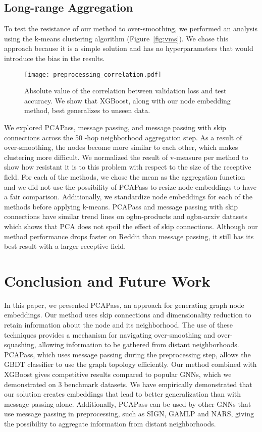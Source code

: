 \documentclass[nohyperref]{article}
\theoremstyle{plain}
\theoremstyle{definition}
\theoremstyle{remark}
\begin{document}
\subsection{Long-range Aggregation}
To test the resistance of our method to over-smoothing, we performed an analysis using the k-means clustering algorithm (Figure~\ref{fig:vms}). We chose this approach because it is a simple solution and has no hyperparameters that would introduce the bias in the results.
\begin{figure}[H]
    \vskip 0.2in
    \begin{center}
    \centerline{\texttt{[image: preprocessing\_correlation.pdf]}}
    \caption{Absolute value of the correlation between validation loss and test accuracy. We show that XGBoost, along with our node embedding method, best generalizes to unseen data.}
    \label{fig:pcapass_corellation}
    \end{center}
    \vskip -0.2in
\end{figure}
We explored PCAPass, message passing, and message passing with skip connections across the 50 -hop neighborhood aggregation step. 
As a result of over-smoothing, the nodes become more similar to each other, which makes clustering more difficult.
We normalized the result of v-measure per method to show how resistant it is to this problem with respect to the size of the receptive field.
For each of the methods, we chose the mean as the aggregation function and we did not use the possibility of PCAPass to resize node embeddings to have a fair comparison.
Additionally, we standardize node embeddings for each of the methods before applying k-means. PCAPass and message passing with skip connections have similar trend lines on ogbn-products and ogbn-arxiv datasets which shows that PCA does not spoil the effect of skip connections.
Although our method performance drops faster on Reddit than message passing, it still has its best result with a larger receptive field.

\section{Conclusion and Future Work}
In this paper, we presented PCAPass, an approach for generating graph node embeddings. Our method uses skip connections and dimensionality reduction to retain information about the node and its neighborhood. The use of these techniques provides a mechanism for navigating over-smoothing and over-squashing, allowing information to be gathered from distant neighborhoods. 
PCAPass, which uses message passing during the preprocessing step, allows the GBDT classifier to use the graph topology efficiently.
Our method combined with XGBoost gives competitive results compared to popular GNNs, which we demonstrated on 3 benchmark datasets. 
We have empirically demonstrated that our solution creates embeddings that lead to better generalization than with message passing alone.
Additionally, PCAPass can be used by other GNNs that use message passing in preprocessing, such as SIGN, GAMLP and NARS, giving the possibility to aggregate information from distant neighborhoods.
\end{document}
